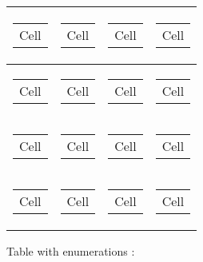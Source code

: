 \begin{longtable}{|l|l|l|l|}
\begin{tabular}[c]{@{}l@{}} Cell \end{tabular} &
\begin{tabular}[c]{@{}l@{}} Cell \end{tabular} &
\begin{tabular}[c]{@{}l@{}} Cell \end{tabular} & 
\begin{tabular}[c]{@{}l@{}} Cell \end{tabular} \\ \hline

\begin{tabular}[c]{@{}l@{}} Cell \end{tabular} &
\begin{tabular}[c]{@{}l@{}} Cell \end{tabular} &
\begin{tabular}[c]{@{}l@{}} Cell \end{tabular} & 
\begin{tabular}[c]{@{}l@{}} Cell \end{tabular} \\ \hline

\begin{tabular}[c]{@{}l@{}} Cell \end{tabular} &
\begin{tabular}[c]{@{}l@{}} Cell \end{tabular} &
\begin{tabular}[c]{@{}l@{}} Cell \end{tabular} & 
\begin{tabular}[c]{@{}l@{}} Cell \end{tabular} \\ \hline

\begin{tabular}[c]{@{}l@{}} Cell \end{tabular} &
\begin{tabular}[c]{@{}l@{}} Cell \end{tabular} &
\begin{tabular}[c]{@{}l@{}} Cell \end{tabular} & 
\begin{tabular}[c]{@{}l@{}} Cell \end{tabular} \\ \hline

\end{longtable}

\newpage

Table with enumerations : \\

